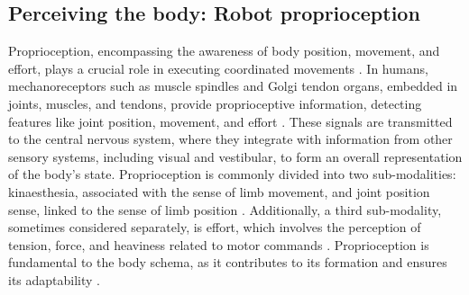 \subsection{Perceiving the body: Robot proprioception}


Proprioception, encompassing the awareness of body position, movement, and effort, plays a crucial role in executing coordinated movements \cite{Kenzie2017compositeroboticbased,Proske2012proprioceptivesensestheir}. In humans, mechanoreceptors such as muscle spindles and Golgi tendon organs, embedded in joints, muscles, and tendons, provide proprioceptive information, detecting features like joint position, movement, and effort \cite{Proske2012proprioceptivesensestheir}. These signals are transmitted to the central nervous system, where they integrate with information from other sensory systems, including visual and vestibular, to form an overall representation of the body's state. Proprioception is commonly divided into two sub-modalities: kinaesthesia, associated with the sense of limb movement, and joint position sense, linked to the sense of limb position \cite{DAntonio2021RoboticAssessmentWrist,Hillier2015AssessingProprioceptionSystematic}. Additionally, a third sub-modality, sometimes considered separately, is effort, which involves the perception of tension, force, and heaviness related to motor commands \cite{Proske2012proprioceptivesensestheir}. Proprioception is fundamental to the body schema, as it contributes to its formation and ensures its adaptability \cite{Cardinali2016Proprioceptionisnecessary}.


